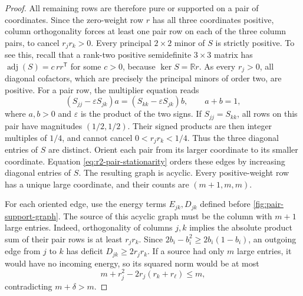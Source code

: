 \documentclass[11pt]{article}
\numberwithin{equation}{section}
\theoremstyle{definition}
\theoremstyle{definition}
\newcommand{\R}{\mathbb R}
\begin{document}
\begin{proof}
All remaining rows are therefore pure or supported on a pair
of coordinates.  Since the zero-weight row $r$ has all three
coordinates positive, column orthogonality forces at least one pair
row on each of the three column pairs, to cancel $r_jr_k>0$.
Every principal $2\times2$ minor of $S$ is strictly positive.
To see this, recall that a rank-two positive semidefinite
$3\times3$ matrix has
$\operatorname{adj}(S)=c\,rr^{\mathsf T}$ for some $c>0$, because
$\ker S=\R r$.  As every $r_j>0$, all diagonal cofactors, which are
precisely the principal minors of order two, are positive.
For a pair row, the multiplier equation reads
\begin{equation}
 (S_{jj}-\varepsilon S_{jk})a
   =(S_{kk}-\varepsilon S_{jk})b,
 \qquad a+b=1,
 \label{eq:r2-pair-stationarity}
\end{equation}
where $a,b>0$ and $\varepsilon$ is the product of the two signs.
If $S_{jj}=S_{kk}$, all rows on this pair have magnitudes
$(1/2,1/2)$. Their signed products are then integer multiples
of $1/4$, and cannot cancel $0<r_jr_k<1/4$.
Thus the three diagonal entries of $S$ are distinct.
Orient each pair from its larger coordinate to its smaller
coordinate. Equation \eqref{eq:r2-pair-stationarity} orders
these edges by increasing diagonal entries of $S$.
The resulting graph is acyclic. Every positive-weight row has a
unique large coordinate, and their counts are $(m+1,m,m)$.

For each oriented edge, use the energy terms $E_{jk},D_{jk}$ defined
before \cref{fig:pair-support-graph}. The source of this acyclic graph must be the column with
$m+1$ large entries.  Indeed, orthogonality of columns $j,k$
implies the absolute product sum of their pair rows is at least
$r_jr_k$.  Since $2b_i-b_i^2\ge2b_i(1-b_i)$, an outgoing edge from
$j$ to $k$ has deficit $D_{jk}\ge2r_jr_k$.
If a source had only $m$ large entries, it would have no incoming
energy, so its squared norm would be at most
\[
 m+r_j^2-2r_j(r_k+r_\ell)\le m,
\]
contradicting $m+\delta>m$.
\end{proof}
\end{document}

